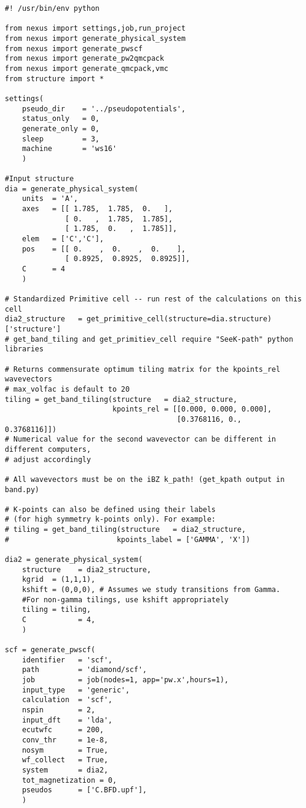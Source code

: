 \documentclass[oneside,11pt]{memoir}
\numberwithin{equation}{section}
\begin{document}
\begin{verbatim}
#! /usr/bin/env python

from nexus import settings,job,run_project
from nexus import generate_physical_system
from nexus import generate_pwscf
from nexus import generate_pw2qmcpack
from nexus import generate_qmcpack,vmc
from structure import *

settings(
    pseudo_dir    = '../pseudopotentials',
    status_only   = 0,
    generate_only = 0,
    sleep         = 3,
    machine       = 'ws16'
    )

#Input structure
dia = generate_physical_system(
    units  = 'A',
    axes   = [[ 1.785,  1.785,  0.   ],
              [ 0.   ,  1.785,  1.785],
              [ 1.785,  0.   ,  1.785]],
    elem   = ['C','C'],
    pos    = [[ 0.    ,  0.    ,  0.    ],
              [ 0.8925,  0.8925,  0.8925]],
    C      = 4
    )

# Standardized Primitive cell -- run rest of the calculations on this cell
dia2_structure   = get_primitive_cell(structure=dia.structure)['structure']
# get_band_tiling and get_primitiev_cell require "SeeK-path" python libraries

# Returns commensurate optimum tiling matrix for the kpoints_rel wavevectors
# max_volfac is default to 20
tiling = get_band_tiling(structure   = dia2_structure,
                         kpoints_rel = [[0.000, 0.000, 0.000],
                                        [0.3768116, 0.,        0.3768116]])
# Numerical value for the second wavevector can be different in different computers, 
# adjust accordingly

# All wavevectors must be on the iBZ k_path! (get_kpath output in band.py)

# K-points can also be defined using their labels 
# (for high symmetry k-points only). For example:
# tiling = get_band_tiling(structure   = dia2_structure,
#                         kpoints_label = ['GAMMA', 'X'])

dia2 = generate_physical_system(
    structure    = dia2_structure,
    kgrid  = (1,1,1),
    kshift = (0,0,0), # Assumes we study transitions from Gamma. 
    #For non-gamma tilings, use kshift appropriately
    tiling = tiling,
    C            = 4,
    )

scf = generate_pwscf(
    identifier   = 'scf',
    path         = 'diamond/scf',
    job          = job(nodes=1, app='pw.x',hours=1),
    input_type   = 'generic',
    calculation  = 'scf',
    nspin        = 2,
    input_dft    = 'lda',
    ecutwfc      = 200,
    conv_thr     = 1e-8,
    nosym        = True,
    wf_collect   = True,
    system       = dia2,
    tot_magnetization = 0,
    pseudos      = ['C.BFD.upf'],
    )


\end{verbatim}
\end{document}
